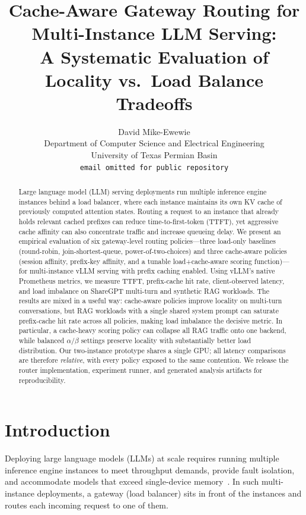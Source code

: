 \documentclass{article}
\title{Cache-Aware Gateway Routing for Multi-Instance LLM Serving:\\A Systematic Evaluation of Locality vs.\ Load Balance Tradeoffs}
\author{
  David Mike-Ewewie \\
  Department of Computer Science and Electrical Engineering \\
  University of Texas Permian Basin \\
  \texttt{email omitted for public repository} \\
}
\begin{document}
\maketitle

\begin{abstract}
Large language model (LLM) serving deployments run multiple inference engine instances behind a load balancer, where each instance maintains its own KV cache of previously computed attention states. Routing a request to an instance that already holds relevant cached prefixes can reduce time-to-first-token (TTFT), yet aggressive cache affinity can also concentrate traffic and increase queueing delay. We present an empirical evaluation of six gateway-level routing policies---three load-only baselines (round-robin, join-shortest-queue, power-of-two-choices) and three cache-aware policies (session affinity, prefix-key affinity, and a tunable load+cache-aware scoring function)---for multi-instance vLLM serving with prefix caching enabled. Using vLLM's native Prometheus metrics, we measure TTFT, prefix-cache hit rate, client-observed latency, and load imbalance on ShareGPT multi-turn and synthetic RAG workloads. The results are mixed in a useful way: cache-aware policies improve locality on multi-turn conversations, but RAG workloads with a single shared system prompt can saturate prefix-cache hit rate across all policies, making load imbalance the decisive metric. In particular, a cache-heavy scoring policy can collapse all RAG traffic onto one backend, while balanced $\alpha/\beta$ settings preserve locality with substantially better load distribution. Our two-instance prototype shares a single GPU; all latency comparisons are therefore \emph{relative}, with every policy exposed to the same contention. We release the router implementation, experiment runner, and generated analysis artifacts for reproducibility.
\end{abstract}

\section{Introduction}
\label{sec:intro}

Deploying large language models (LLMs) at scale requires running multiple inference engine instances to meet throughput demands, provide fault isolation, and accommodate models that exceed single-device memory~\citep{kwon2023pagedattention, zhong2024distserve}. In such multi-instance deployments, a gateway (load balancer) sits in front of the instances and routes each incoming request to one of them.
\end{document}
